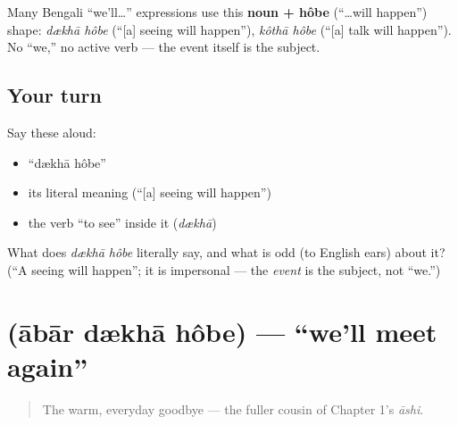 \begin{grammarlens}[title={Grammar Lens: the impersonal future}]
Many Bengali \textquotedblleft{}we'll…\textquotedblright{} expressions use this \textbf{noun + hôbe} (\textquotedblleft{}…will happen\textquotedblright{}) shape: \emph{dækhā hôbe} (\textquotedblleft{}{[}a{]} seeing will happen\textquotedblright{}), \emph{kôthā hôbe} (\textquotedblleft{}{[}a{]} talk will happen\textquotedblright{}). No \textquotedblleft{}we,\textquotedblright{} no active verb — the event itself is the subject.
\end{grammarlens}

\subsection*{Your turn}
Say these aloud:

\begin{itemize}
\raggedright
  \item \textquotedblleft{}dækhā hôbe\textquotedblright{}
  \item its literal meaning (\textquotedblleft{}{[}a{]} seeing will happen\textquotedblright{})
  \item the verb \textquotedblleft{}to see\textquotedblright{} inside it (\emph{dækhā})
\end{itemize}

\begin{tcolorbox}[breakable,colback=teal!4,colframe=teal!35!black,title={Before you move on}]
What does \emph{dækhā hôbe} literally say, and what is odd (to English ears) about it? (\textquotedblleft{}A seeing will happen\textquotedblright{}; it is impersonal — the \emph{event} is the subject, not \textquotedblleft{}we.\textquotedblright{})
\end{tcolorbox}
\section[\bn{আবার} \bn{দেখা} \bn{হবে}]{   (ābār dækhā hôbe) — \textquotedblleft{}we'll meet again\textquotedblright{}}

\label{lesson:BN-C04-abar-dekha-hobe}



\begin{quote}
The warm, everyday goodbye — the fuller cousin of Chapter 1's \emph{āshi}.
\end{quote}

